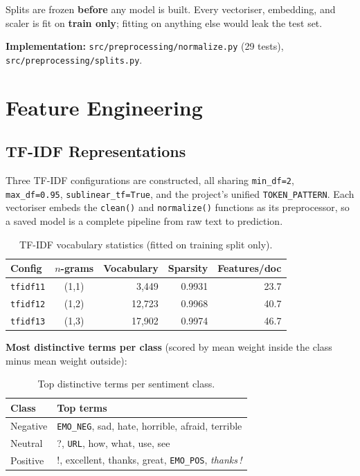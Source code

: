 \documentclass[11pt,a4paper]{article}
\begin{document}
Splits are frozen \textbf{before} any model is built. Every vectoriser, embedding, and scaler is fit on \textbf{train only}; fitting on anything else would leak the test set.

\textbf{Implementation:} \texttt{src/preprocessing/normalize.py} (29 tests), \texttt{src/preprocessing/splits.py}.

\section{Feature Engineering}
\label{sec:features}

\subsection{TF-IDF Representations}

Three TF-IDF configurations are constructed, all sharing \texttt{min\_df=2}, \texttt{max\_df=0.95}, \texttt{sublinear\_tf=True}, and the project's unified \texttt{TOKEN\_PATTERN}. Each vectoriser embeds the \texttt{clean()} and \texttt{normalize()} functions as its preprocessor, so a saved model is a complete pipeline from raw text to prediction.

\begin{table}[H]
\centering
\caption{TF-IDF vocabulary statistics (fitted on training split only).}
\label{tab:tfidf}
\begin{tabular}{lcrrr}
\toprule
\textbf{Config} & \textbf{$n$-grams} & \textbf{Vocabulary} & \textbf{Sparsity} & \textbf{Features/doc} \\
\midrule
\texttt{tfidf11} & (1,1) & 3,449  & 0.9931 & 23.7 \\
\texttt{tfidf12} & (1,2) & 12,723 & 0.9968 & 40.7 \\
\texttt{tfidf13} & (1,3) & 17,902 & 0.9974 & 46.7 \\
\bottomrule
\end{tabular}
\end{table}

\textbf{Most distinctive terms per class} (scored by mean weight inside the class minus mean weight outside):

\begin{table}[H]
\centering
\caption{Top distinctive terms per sentiment class.}
\begin{tabular}{ll}
\toprule
\textbf{Class} & \textbf{Top terms} \\
\midrule
Negative & \texttt{EMO\_NEG}, sad, hate, horrible, afraid, terrible \\
Neutral  & ?, \texttt{URL}, how, what, use, see \\
Positive & !, excellent, thanks, great, \texttt{EMO\_POS}, \textit{thanks\,!} \\
\bottomrule
\end{tabular}
\end{table}
\end{document}
